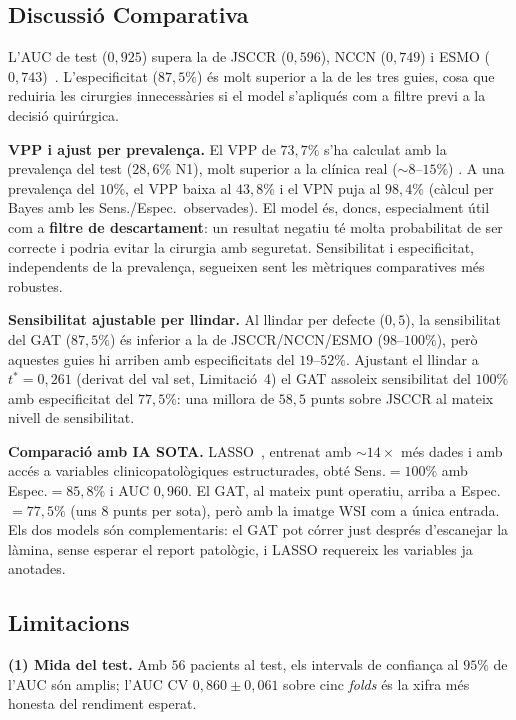 \documentclass[10pt,a4paper,twocolumn,twoside]{article}
\begin{document}
\subsection{Discussió Comparativa}

L'AUC de test ($0{,}925$) supera la de JSCCR ($0{,}596$), NCCN ($0{,}749$) i ESMO
($0{,}743$)~\cite{tanino2024comparative}. L'especificitat ($87{,}5\%$) és molt
superior a la de les tres guies, cosa que reduiria les cirurgies innecessàries
si el model s'apliqués com a filtre previ a la decisió quirúrgica.

\textbf{VPP i ajust per prevalença.}
El VPP de $73{,}7\%$ s'ha calculat amb la prevalença del test ($28{,}6\%$ N1),
molt superior a la clínica real ($\sim\!8$–$15\%$) \cite{zaffalon2023}. A una
prevalença del $10\%$, el VPP baixa al $43{,}8\%$ i el VPN puja al $98{,}4\%$
(càlcul per Bayes amb les Sens./Espec.\ observades). El model és, doncs,
especialment útil com a \textbf{filtre de descartament}: un resultat negatiu
té molta probabilitat de ser correcte i podria evitar la cirurgia amb seguretat.
Sensibilitat i especificitat, independents de la prevalença, segueixen sent les
mètriques comparatives més robustes.

\textbf{Sensibilitat ajustable per llindar.}
Al llindar per defecte ($0{,}5$), la sensibilitat del GAT ($87{,}5\%$) és
inferior a la de JSCCR/NCCN/ESMO ($98$–$100\%$), però aquestes guies hi
arriben amb especificitats del $19$–$52\%$. Ajustant el llindar a $t^*\!=\!0{,}261$
(derivat del val set, Limitació~4) el GAT assoleix sensibilitat del $100\%$
amb especificitat del $77{,}5\%$: una millora de $58{,}5$ punts sobre JSCCR al
mateix nivell de sensibilitat.

\textbf{Comparació amb IA SOTA.}
LASSO~\cite{piao2023ai}, entrenat amb $\sim\!14\!\times$ més dades i amb
accés a variables clinicopatològiques estructurades, obté Sens.$=\!100\%$
amb Espec.$=\!85{,}8\%$ i AUC $0{,}960$. El GAT, al mateix punt operatiu,
arriba a Espec.$=\!77{,}5\%$ (uns $8$ punts per sota), però amb la imatge
WSI com a única entrada. Els dos models són complementaris: el GAT pot
córrer just després d'escanejar la làmina, sense esperar el report
patològic, i LASSO requereix les variables ja anotades.

\subsection{Limitacions}
\label{sec:limitacions}

\textbf{(1) Mida del test.}
Amb $56$ pacients al test, els intervals de confiança al $95\%$ de l'AUC són amplis;
l'AUC CV $0{,}860 \pm 0{,}061$ sobre cinc \textit{folds} és la xifra més honesta del
rendiment esperat.
\end{document}
